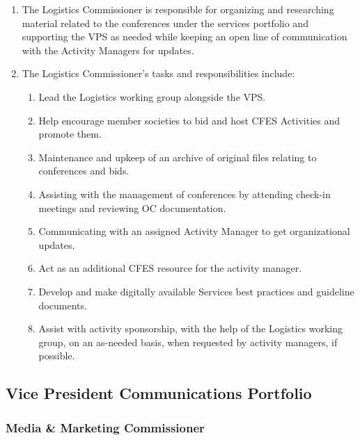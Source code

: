 \begin{enumerate}
 \item
  The Logistics Commissioner is responsible for organizing and researching material related to the conferences under the services portfolio and supporting the VPS as needed while keeping an open line of communication with the Activity Managers for updates.
 \item
  The Logistics Commissioner’s tasks and responsibilities include:

  \begin{enumerate}
   \item
    Lead the Logistics working group alongside the VPS.
   \item
    Help encourage member societies to bid and host CFES Activities and promote them.
   \item
    Maintenance and upkeep of an archive of original files relating to conferences and bids.
   \item
    Assisting with the management of conferences by attending check-in meetings and reviewing OC documentation.
   \item
    Communicating with an assigned Activity Manager to get organizational updates.
   \item
    Act as an additional CFES resource for the activity manager.
   \item
    Develop and make digitally available Services best practices and guideline documents.
   \item
    Assist with activity sponsorship, with the help of the Logistics working group, on an as-needed basis, when requested by activity managers, if possible.
  \end{enumerate}
\end{enumerate}

\subsection{Vice President Communications Portfolio}
\label{vpc-portfolio}

\subsubsection{Media \& Marketing Commissioner}
\label{media-marketing-commissioner}


